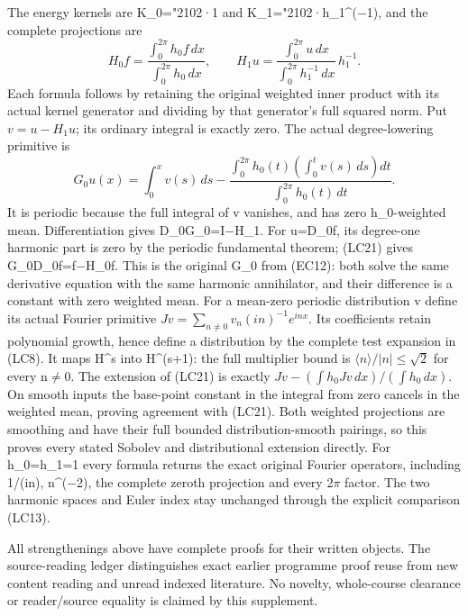 \documentclass[
  11pt,
]{article}
\begin{document}
The energy kernels are K\_0={\ReaderSymbols\char"2102}·1 and K\_1={\ReaderSymbols\char"2102}·h\_1\^{}(−1), and the
complete projections are \[
H_0f=\frac{\int_0^{2\pi}h_0 f\,dx}{\int_0^{2\pi}h_0\,dx},
\qquad
H_1u=\frac{\int_0^{2\pi}u\,dx}{\int_0^{2\pi}h_1^{-1}\,dx}\,h_1^{-1}.
\tag{LC20}
\] Each formula follows by retaining the original weighted inner product
with its actual kernel generator and dividing by that generator's full
squared norm. Put \(v=u-H_1u\); its ordinary integral is exactly zero.
The actual degree-lowering primitive is \[
G_0u(x)=\int_0^xv(s)\,ds
 -\frac{\displaystyle\int_0^{2\pi}h_0(t)
                       \left(\int_0^tv(s)\,ds\right)dt}
        {\displaystyle\int_0^{2\pi}h_0(t)\,dt}.
\tag{LC21}
\] It is periodic because the full integral of v vanishes, and has zero
h\_0-weighted mean. Differentiation gives D\_0G\_0=I−H\_1. For u=D\_0f,
its degree-one harmonic part is zero by the periodic fundamental
theorem; (LC21) gives G\_0D\_0f=f−H\_0f. This is the original G\_0 from
(EC12): both solve the same derivative equation with the same harmonic
annihilator, and their difference is a constant with zero weighted mean.
For a mean-zero periodic distribution v define its actual Fourier
primitive \(Jv=\sum_{n\ne0}v_n(in)^{-1}e^{inx}\). Its coefficients
retain polynomial growth, hence define a distribution by the complete
test expansion in (LC8). It maps H\^{}s into H\^{}(s+1): the full
multiplier bound is \(\langle n\rangle/|n|\leq\sqrt2\) for every n\ensuremath{\ne}0.
The extension of (LC21) is exactly
\(Jv-(\int h_0Jv\,dx)/(\int h_0\,dx)\). On smooth inputs the base-point
constant in the integral from zero cancels in the weighted mean, proving
agreement with (LC21). Both weighted projections are smoothing and have
their full bounded distribution-smooth pairings, so this proves every
stated Sobolev and distributional extension directly. For h\_0=h\_1=1
every formula returns the exact original Fourier operators, including
1/(in), n\^{}(−2), the complete zeroth projection and every 2\ensuremath{\pi} factor.
The two harmonic spaces and Euler index stay unchanged through the
explicit comparison (LC13).

All strengthenings above have complete proofs for their written objects.
The source-reading ledger distinguishes exact earlier programme proof
reuse from new content reading and unread indexed literature. No
novelty, whole-course clearance or reader/source equality is claimed by
this supplement.
\end{document}
